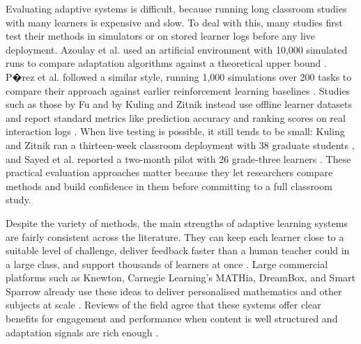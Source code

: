 Evaluating adaptive systems is difficult, because running long classroom studies with many learners is expensive and slow. To deal with this, many studies first test their methods in simulators or on stored learner logs before any live deployment. Azoulay et al. used an artificial environment with 10{,}000 simulated runs to compare adaptation algorithms against a theoretical upper bound \cite{azoulay_adaptive_2021}. P�rez et al. followed a similar style, running 1{,}000 simulations over 200 tasks to compare their approach against earlier reinforcement learning baselines \cite{perez_emotions_2024}. Studies such as those by Fu and by Kuling and Zitnik instead use offline learner datasets and report standard metrics like prediction accuracy and ranking scores on real interaction logs \cite{fu_integrating_2025,kuling_ken_2025}. When live testing is possible, it still tends to be small: Kuling and Zitnik ran a thirteen-week classroom deployment with 38 graduate students \cite{kuling_ken_2025}, and Sayed et al. reported a two-month pilot with 26 grade-three learners \cite{sayed_ai-based_2023}. These practical evaluation approaches matter because they let researchers compare methods and build confidence in them before committing to a full classroom study.

Despite the variety of methods, the main strengths of adaptive learning systems are fairly consistent across the literature. They can keep each learner close to a suitable level of challenge, deliver feedback faster than a human teacher could in a large class, and support thousands of learners at once \cite{gligorea_adaptive_2023}. Large commercial platforms such as Knewton, Carnegie Learning's MATHia, DreamBox, and Smart Sparrow already use these ideas to deliver personalised mathematics and other subjects at scale \cite{strielkowski_span_2025}. Reviews of the field agree that these systems offer clear benefits for engagement and performance when content is well structured and adaptation signals are rich enough \cite{gligorea_adaptive_2023,zerkouk_comprehensive_2025}.

